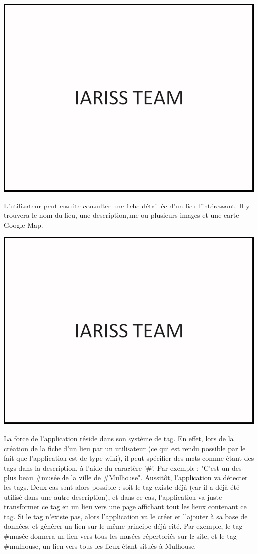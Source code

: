 \documentclass[12pt, a4paper]{article}
\newcommand{\espace}{\vspace{.8cm}}
\begin{document}
\espace{}
\includegraphics{img/test.png}

\espace{}
L'utilisateur peut ensuite consulter une fiche détaillée d'un lieu l'intéressant. Il y trouvera le nom du lieu, une description,une ou plusieurs images et une carte Google Map.

\espace{}
\includegraphics[width=.9\textwidth, keepaspectratio=true]{img/test.png}

\espace{}
La force de l'application réside dans son système de tag. En effet, lors de la création de la fiche d'un lieu par un utilisateur (ce qui est rendu possible par le fait que l'application est de type wiki), il peut spécifier des mots comme étant des tags dans la description, à l'aide du caractère '\#'. Par exemple : "C'est un des plus beau \#musée de la ville de \#Mulhouse". Aussitôt, l'application va détecter les tags. Deux cas sont alors possible : soit le tag existe déjà (car il a déjà été utilisé dans une autre description), et dans ce cas, l'application va juste transformer ce tag en un lieu vers une page affichant tout les lieux contenant ce tag. Si le tag n'existe pas, alors l'application va le créer et l'ajouter à sa base de données, et générer un lien sur le même principe déjà cité. Par exemple, le tag \#musée donnera un lien vers tous les musées répertoriés sur le site, et le tag \#mulhouse, un lien vers tous les lieux étant situés à Mulhouse.
\end{document}

